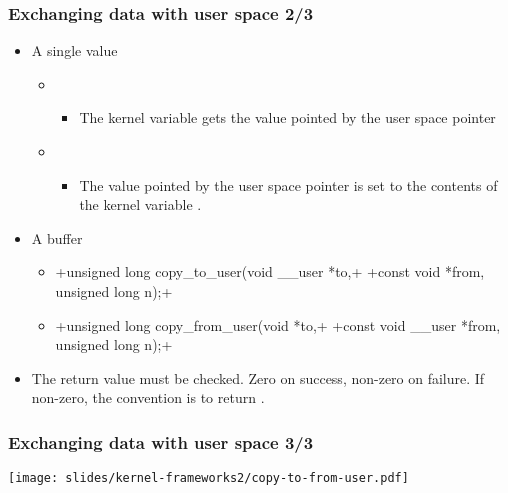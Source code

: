 \begin{frame}[fragile]
  \frametitle{Exchanging data with user space 2/3}
  \begin{itemize}
  \item A single value
    \begin{itemize}
    \item {}
      \begin{itemize}
      \item The kernel variable  gets the value pointed by the
        user space pointer 
      \end{itemize}
    \item {}
      \begin{itemize}
      \item The value pointed by the user space pointer  is
        set to the contents of the kernel variable .
      \end{itemize}
    \end{itemize}
  \item A buffer
    \begin{itemize}
    \item {}+unsigned long copy_to_user(void __user *to,+
      +const void *from, unsigned long n);+
    \item {}+unsigned long copy_from_user(void *to,+
      +const void __user *from, unsigned long n);+
    \end{itemize}
  \item The return value must be checked. Zero on success, non-zero on
    failure. If non-zero, the convention is to return \code{-}.
  \end{itemize}
\end{frame}

\begin{frame}
 \frametitle{Exchanging data with user space 3/3}
 \begin{center}
    \texttt{[image: slides/kernel-frameworks2/copy-to-from-user.pdf]}
 \end{center}
\end{frame}

